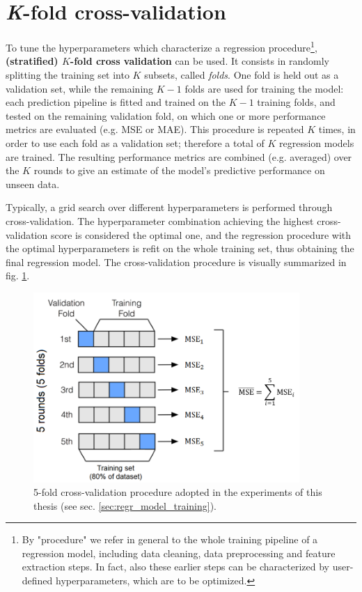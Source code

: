 \section{\textit{K}-fold cross-validation}
\label{sec:cv}
To tune the hyperparameters which characterize a regression procedure\footnote{By "procedure" we refer in general to the whole training pipeline of a regression model, including data cleaning, data preprocessing and feature extraction steps. In fact, also these earlier steps can be characterized by user-defined hyperparameters, which are to be optimized.}, \textbf{(stratified) $K$-fold cross validation} can be used. It consists in randomly splitting the training set into $K$ subsets, called \textit{folds}. One fold is held out as a validation set, while the remaining $K-1$ folds are used for training the model: each prediction pipeline is fitted and trained on the $K-1$ training folds, and tested on the remaining validation fold, on which one or more performance metrics are evaluated (e.g. MSE or MAE). This procedure is repeated $K$ times, in order to use each fold as a validation set; therefore a total of $K$ regression models are trained. The resulting performance metrics are combined (e.g. averaged) over the $K$ rounds to give an estimate of the model's predictive performance on unseen data.

Typically, a grid search over different hyperparameters is performed through cross-validation. The hyperparameter combination achieving the highest cross-validation score is considered the optimal one, and the regression procedure with the optimal hyperparameters is refit on the whole training set, thus obtaining the final regression model. The cross-validation procedure is visually summarized in fig. \ref{fig:cross_validation}.

\begin{figure}[hbt!]
    \centering
    \includegraphics[width=0.9\textwidth]{images/cross_validation}
    \caption[5-fold cross-validation]{5-fold cross-validation procedure adopted in the experiments of this thesis (see sec. \ref{sec:regr_model_training}).}
    \label{fig:cross_validation}
\end{figure}